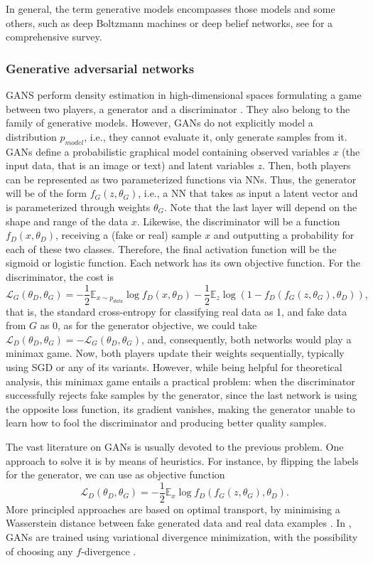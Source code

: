 In general, the term generative models 
encompasses those models and some others, such as deep Boltzmann machines or deep belief networks, see \cite{doi:10.1146/annurev-statistics-010814-020120} for a comprehensive survey.

\subsubsection{Generative adversarial networks} GANS  perform density estimation in high-dimensional spaces formulating a game between two players, a generator and a discriminator \citep{goodfellow2014generative}. They also belong to the family of generative models. However, GANs do not explicitly model a distribution $p_{model}$, i.e., they cannot evaluate it, only generate samples from it.
GANs define a probabilistic graphical model containing observed variables $x$ (the input data, that is an image or text) and latent variables $z$. Then, both players can be represented as two parameterized functions via NNs. Thus, the generator will be of the form $f_G(z, \theta_G)$, i.e., a NN that takes as input a latent vector and is parameterized through weights $\theta_G$. Note that the last layer will depend on the shape and range of the data $x$. Likewise, the discriminator will be a function $f_D(x, \theta_D)$, receiving a (fake or real) sample $x$ and outputting a probability for each of these two classes. Therefore, the final activation function will be 
the sigmoid or logistic function. Each network has its own objective function. For the discriminator, the cost is
$$
\mathcal{L}_G(\theta_D, \theta_G) = -\dfrac{1}{2} \mathbb{E}_{x \sim p_{data}} \log f_D(x, \theta_D) -\dfrac{1}{2} \mathbb{E}_z \log (1 - f_D(f_G(z, \theta_G), \theta_D)),
$$
that is, the standard cross-entropy for classifying real data as 1, and fake data from $G$ as 0, as for the generator objective, we could take $\mathcal{L}_D(\theta_D, \theta_G) = -\mathcal{L}_G(\theta_D, \theta_G)$,
and, consequently, both networks would play a minimax game.
Now, both players update their weights sequentially, typically using SGD or any of its variants.
However, while being helpful for theoretical analysis, 
this minimax game entails a practical problem: when the discriminator successfully rejects fake samples by the generator, since the last network is using the opposite loss function, its gradient vanishes, making the generator unable to learn how to fool the discriminator and producing better quality samples.

The vast literature on GANs is usually devoted to the previous problem. One approach to solve it is by means of heuristics. For instance, by flipping the labels for the generator, we can use as objective function
$$
\mathcal{L}_D(\theta_D, \theta_G) = -\dfrac{1}{2} \mathbb{E}_{x} \log f_D(f_G(z, \theta_G), \theta_D).
$$
More principled approaches are based on optimal transport, by minimising a Wasserstein distance between fake generated data and real data examples \citep{arjovsky2017wasserstein}. In \cite{nowozin2016f}, GANs are trained using variational divergence minimization, with the possibility of choosing any $f$-divergence \citep{CIT-004}.


